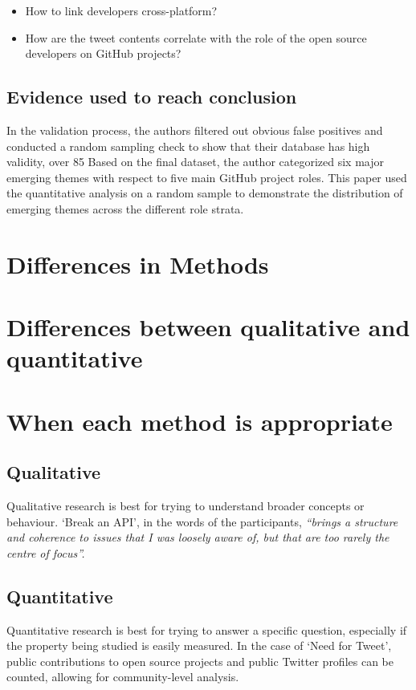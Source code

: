 \documentclass[conference]{IEEEtran}
\begin{document}
\begin{itemize}
    \item How to link developers cross-platform?
    \item How are the tweet contents correlate with the role of the open source developers on GitHub projects?
\end{itemize}
\subsection{Evidence used to reach conclusion}
In the validation process, the authors filtered out obvious false positives and conducted a random sampling check to show that their database has high validity, over 85%
Based on the final dataset, the author categorized six major emerging themes with respect to five main GitHub project roles.
This paper used the quantitative analysis on a random sample to demonstrate the distribution of emerging themes across the different role strata.

\section{Differences in Methods}

\section{Differences between qualitative and quantitative}

\section{When each method is appropriate}

\subsection{Qualitative}

Qualitative research is best for trying to understand broader concepts or behaviour.
`Break an API', in the words of the participants, \textit{ ``brings a structure and coherence to issues that I was loosely aware of, but that are too rarely the centre of focus''.}
\subsection{Quantitative}

Quantitative research is best for trying to answer a specific question, especially if the property being studied is easily measured. In the case of `Need for Tweet', public contributions to open source projects and public Twitter profiles can be counted, allowing for community-level analysis.
\end{document}
